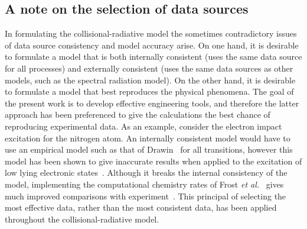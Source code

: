 \subsection{A note on the selection of data sources}

In formulating the collisional-radiative model the sometimes contradictory issues of data source consistency and model accuracy arise.
On one hand, it is desirable to formulate a model that is both internally consistent (uses the same data source for all processes) and externally consistent (uses the same data sources as other models, such as the spectral radiation model).
On the other hand, it is desirable to formulate a model that best reproduces the physical phenomena.
The goal of the present work is to develop effective engineering tools, and therefore the latter approach has been preferenced to give the calculations the best chance of reproducing experimental data.
As an example, consider the electron impact excitation for the nitrogen atom.
An internally consistent model would have to use an empirical model such as that of Drawin~\cite{drawin_1968} for all transitions, however this model has been shown to give inaccurate results when applied to the excitation of low lying electronic states~\cite{panesi_2008B,panesi_phd}.
Although it breaks the internal consistency of the model, implementing the computational chemistry rates of Frost \textit{et al.}~\cite{FAS+1998} gives much improved comparisons with experiment~\cite{panesi_2008B,panesi_phd}.
This principal of selecting the most effective data, rather than the most consistent data, has been applied throughout the collisional-radiative model.


